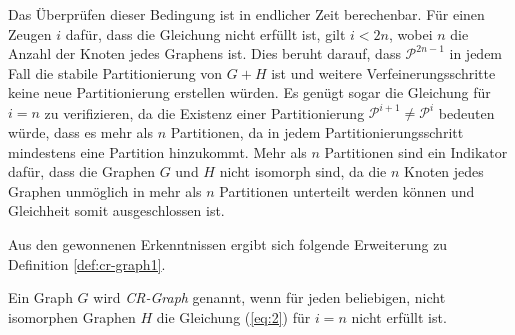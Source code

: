 Das Überprüfen dieser Bedingung ist in endlicher Zeit berechenbar. Für einen Zeugen $i$ dafür, dass die Gleichung nicht erfüllt ist, gilt $i<2n$, wobei $n$ die Anzahl der Knoten jedes Graphens ist. Dies beruht darauf, dass $\mathcal{P}^{2n-1}$ in jedem Fall die stabile Partitionierung von $G+H$ ist und weitere Verfeinerungsschritte keine neue Partitionierung erstellen würden. Es genügt sogar die Gleichung für $i=n$ zu verifizieren, da die Existenz einer Partitionierung $\mathcal{P}^{i+1}\neq \mathcal{P}^i$ bedeuten würde, dass es mehr als $n$ Partitionen, da in jedem Partitionierungsschritt mindestens eine Partition hinzukommt. Mehr als $n$ Partitionen sind ein Indikator dafür, dass die Graphen $G$ und $H$ nicht isomorph sind, da die $n$ Knoten jedes Graphen unmöglich in mehr als $n$ Partitionen unterteilt werden können und Gleichheit somit ausgeschlossen ist.

Aus den gewonnenen Erkenntnissen ergibt sich folgende Erweiterung zu Definition \ref{def:cr-graph1}.
\begin{Definition}
	Ein Graph $G$ wird \emph{CR-Graph} genannt, wenn für jeden beliebigen, nicht isomorphen Graphen $H$ die Gleichung (\ref{eq:2}) für $i=n$ nicht erfüllt ist.
\end{Definition}